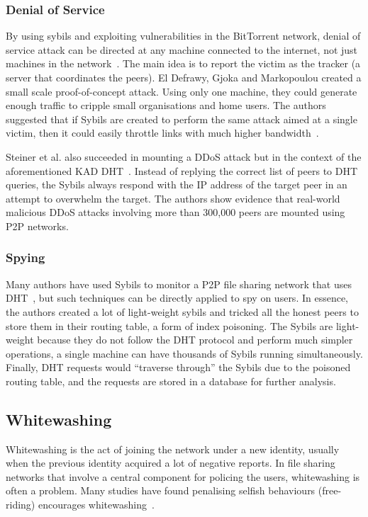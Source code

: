 \subsubsection{Denial of Service}
By using sybils and exploiting vulnerabilities in the BitTorrent network, denial
of service attack can be directed at any machine connected to the internet, not
just machines in the network~\cite{sia2006ddos}. The main idea is to report the
victim as the tracker (a server that coordinates the peers). El Defrawy, Gjoka
and Markopoulou created a small scale proof-of-concept attack. Using only one
machine, they could generate enough traffic to cripple small organisations and
home users. The authors suggested that if Sybils are created to perform the same
attack aimed at a single victim, then it could easily throttle links with much
higher bandwidth~\cite{el2007bottorrent}.

Steiner et al. also succeeded in mounting a DDoS attack but in the context of
the aforementioned KAD DHT~\cite{steiner2007exploiting}. Instead of replying the
correct list of peers to DHT queries, the Sybils always respond with the IP
address of the target peer in an attempt to overwhelm the target. The authors
show evidence that real-world malicious DDoS attacks involving more than 300,000
peers are mounted using P2P networks.

\subsubsection{Spying}
Many authors have used Sybils to monitor a P2P file sharing network that uses
DHT~\cite{holz2008measurements, steiner2007exploiting}, but such techniques can
be directly applied to spy on users. In essence, the authors created a lot of
light-weight sybils and tricked all the honest peers to store them in their
routing table, a form of index poisoning. The Sybils are light-weight because
they do not follow the DHT protocol and perform much simpler operations, a
single machine can have thousands of Sybils running simultaneously. Finally, DHT
requests would ``traverse through'' the Sybils due to the poisoned routing
table, and the requests are stored in a database for further analysis.

\subsection{Whitewashing}
Whitewashing is the act of joining the network under a new identity, usually
when the previous identity acquired a lot of negative reports. In file sharing
networks that involve a central component for policing the users, whitewashing
is often a problem. Many studies have found penalising selfish behaviours
(free-riding) encourages whitewashing~\cite{feldman2004free, yang2005empirical}.

